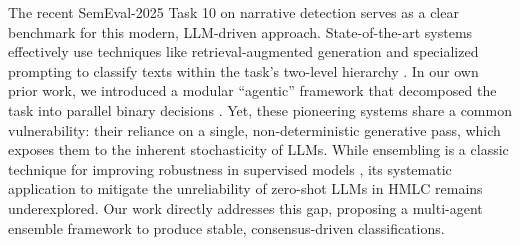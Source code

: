 The recent SemEval-2025 Task 10 on narrative detection serves as a clear benchmark for this modern, LLM-driven approach. State-of-the-art systems effectively use techniques like retrieval-augmented generation and specialized prompting to classify texts within the task's two-level hierarchy \citep{singh-etal-2025-gatenlp,younus-qureshi-2025-nlptuducd}. In our own prior work, we introduced a modular ``agentic'' framework that decomposed the task into parallel binary decisions \citep{eljadiri-nurbakova-2025-team}. Yet, these pioneering systems share a common vulnerability: their reliance on a single, non-deterministic generative pass, which exposes them to the inherent stochasticity of LLMs. While ensembling is a classic technique for improving robustness in supervised models \citep{jurkiewicz-etal-2020-applicaai}, its systematic application to mitigate the unreliability of zero-shot LLMs in HMLC remains underexplored. Our work directly addresses this gap, proposing a multi-agent ensemble framework to produce stable, consensus-driven classifications.
